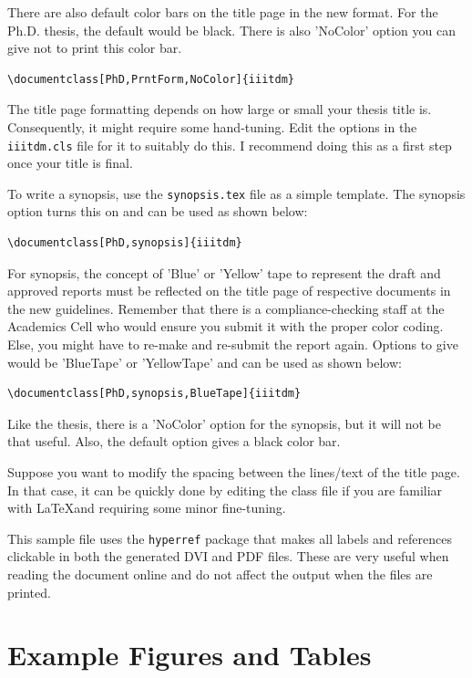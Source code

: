 There are also default color bars on the title page in the new format. For the Ph.D. thesis, the default would be black. There is also 'NoColor' option you can give not to print this color bar.

\begin{verbatim}
\documentclass[PhD,PrntForm,NoColor]{iiitdm}  
\end{verbatim}

The title page formatting depends on how large or small your thesis title is.  Consequently, it might require some hand-tuning.  Edit the options in the \verb+iiitdm.cls+ file for it to suitably do this. I recommend doing this as a first step once your title is final.

To write a synopsis, use the \verb+synopsis.tex+ file as a simple template. The synopsis option turns this on and can be used as shown below:
\begin{verbatim}
\documentclass[PhD,synopsis]{iiitdm}                                
\end{verbatim}

For synopsis, the concept of 'Blue' or 'Yellow' tape to represent the draft and approved reports must be reflected on the title page of respective documents in the new guidelines. Remember that there is a compliance-checking staff at the Academics Cell who would ensure you submit it with the proper color coding. Else, you might have to re-make and re-submit the report again. Options to give would be 'BlueTape' or 'YellowTape' and can be used as shown below:
\begin{verbatim}
\documentclass[PhD,synopsis,BlueTape]{iiitdm}                                
\end{verbatim}

Like the thesis, there is a 'NoColor' option for the synopsis, but it will not be that useful. Also, the default option gives a black color bar.

Suppose you want to modify the spacing between the lines/text of the title page. In that case, it can be quickly done by editing the class file if you are familiar with \LaTeX and requiring some minor fine-tuning.

This sample file uses the \verb+hyperref+ package that makes all labels and references clickable in both the generated DVI and PDF files.  These are very useful when reading the document online and do not affect the output when the files are printed.

\section{Example Figures and Tables}

